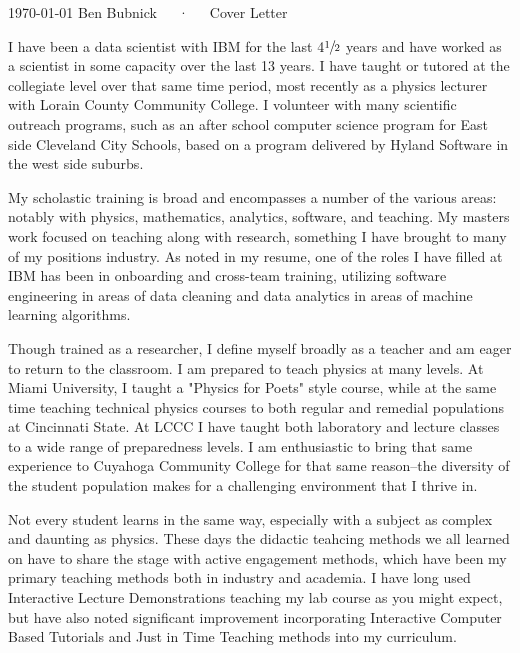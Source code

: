 \documentclass[11pt, a4paper]{awesome-cv}
\begin{document}
\makecvheader[R]

\makecvfooter
  {\today}
  {Ben Bubnick~~~·~~~Cover Letter}
  {}

\makelettertitle

\begin{cvletter}

I have been a data scientist with IBM for the last 4$\sfrac{1}{2}$ years and have worked as a scientist in some capacity over the last 13 years.  I have taught or tutored at the collegiate level over that same time period, most recently as a physics lecturer with Lorain County Community College.  I volunteer with many scientific outreach programs, such as an after school computer science program for East side Cleveland City Schools, based on a program delivered by Hyland Software in the west side suburbs.

My scholastic training is broad and encompasses a number of the various areas: notably with physics, mathematics, analytics, software, and teaching.  My masters work focused on teaching along with research, something I have brought to many of my positions industry.  As noted in my resume, one of the roles I have filled at IBM has been in onboarding and cross-team training, utilizing software engineering in areas of data cleaning and data analytics in areas of machine learning algorithms.

Though trained as a researcher, I define myself broadly as a teacher and am eager to return to the classroom. I am prepared to teach physics at many levels.  At Miami University, I taught a "Physics for Poets" style course, while at the same time teaching technical physics courses to both regular and remedial populations at Cincinnati State.  At LCCC I have taught both laboratory and lecture classes to a wide range of preparedness levels.  I am enthusiastic to bring that same experience to Cuyahoga Community College for that same reason--the diversity of the student population makes for a challenging environment that I thrive in.

Not every student learns in the same way, especially with a subject as complex and daunting as physics.  These days the didactic teahcing methods we all learned on have to share the stage with active engagement methods, which have been my primary teaching methods both in industry and academia.  I have long used Interactive Lecture Demonstrations teaching my lab course as you might expect, but have also noted significant improvement incorporating Interactive Computer Based Tutorials and Just in Time Teaching methods into my curriculum.  %

\end{cvletter}


\makeletterclosing
\end{document}
